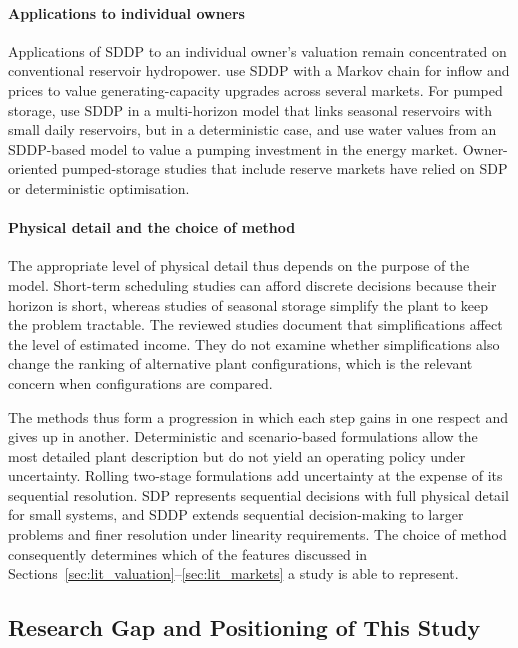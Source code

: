 \paragraph{Applications to individual owners}
Applications of SDDP to an individual owner's valuation remain
concentrated on conventional reservoir hydropower.
\citet{bore2026assessing} use SDDP with a Markov chain for inflow and
prices to value generating-capacity upgrades across several markets.
For pumped storage, \citet{abgottspon2016multihorizon} use SDDP in a
multi-horizon model that links seasonal reservoirs with small daily
reservoirs, but in a deterministic case, and
\citet{schuller2024practical} use water values from an SDDP-based model
to value a pumping investment in the energy market. Owner-oriented
pumped-storage studies that include reserve markets have relied on SDP
or deterministic optimisation.

\paragraph{Physical detail and the choice of method}
The appropriate level of physical detail thus depends on the purpose of
the model. Short-term scheduling studies can afford discrete decisions
because their horizon is short, whereas studies of seasonal storage
simplify the plant to keep the problem tractable. The reviewed studies
document that simplifications affect the level of estimated income.
They do not examine whether simplifications also change the ranking of
alternative plant configurations, which is the relevant concern when
configurations are compared.

The methods thus form a progression in which each step gains in one
respect and gives up in another. Deterministic and scenario-based
formulations allow the most detailed plant description but do not yield
an operating policy under uncertainty. Rolling two-stage formulations
add uncertainty at the expense of its sequential resolution. SDP
represents sequential decisions with full physical detail for small
systems, and SDDP extends sequential decision-making to larger problems
and finer resolution under linearity requirements. The choice of method
consequently determines which of the features discussed in
Sections~\ref{sec:lit_valuation}--\ref{sec:lit_markets} a study is able
to represent.

\subsection{Research Gap and Positioning of This Study}
\label{sec:lit_gap}


